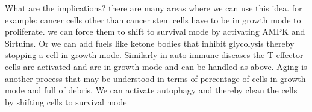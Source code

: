 What are the implications?
there are many areas where we can use this idea. for example: cancer cells other than cancer stem cells have to be in growth mode to proliferate. we can force them to shift to survival mode by activating AMPK and Sirtuins. Or we can add fuels like ketone bodies that inhibit glycolysis thereby stopping a cell in growth mode. Similarly in auto immune diseases the T effector cells are activated and are in growth mode and can be handled as above. Aging is another process that may be understood in terms of percentage of cells in growth mode and full of debris. We can activate autophagy and thereby clean the cells by shifting cells to survival mode